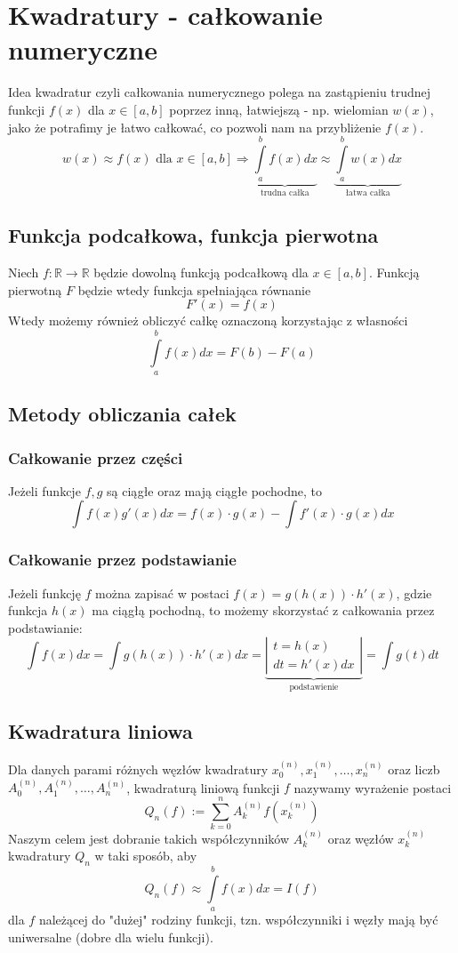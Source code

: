 \documentclass[a4paper,11pt]{article}
\begin{document}
\clearpage
\section{Kwadratury - całkowanie numeryczne}
Idea kwadratur czyli całkowania numerycznego polega na zastąpieniu trudnej funkcji $f(x)$ dla $x\in[a,b]$ poprzez inną, łatwiejszą - np. wielomian $w(x)$, jako że potrafimy je łatwo całkować, co pozwoli nam na przybliżenie $f(x)$.\\
$$w(x) \approx f(x) \text{ dla } x\in[a,b] \Rightarrow \underbrace{\int\limits_{a}^{b} f(x)dx}_{\text{trudna całka}} \approx \underbrace{\int\limits_{a}^{b} w(x)dx}_{\text{łatwa całka}}$$

\subsection{Funkcja podcałkowa, funkcja pierwotna}
Niech $f: \mathbb{R}\to\mathbb{R}$ będzie dowolną funkcją podcałkową dla $x \in [a,b]$. Funkcją pierwotną $F$ będzie wtedy funkcja spełniająca równanie
$$ F'(x) = f(x)$$
\noindent Wtedy możemy również obliczyć całkę oznaczoną korzystając z własności
$$\int\limits_{a}^{b} f(x)dx = F(b) - F(a)$$

\subsection{Metody obliczania całek}
\subsubsection{Całkowanie przez części}
Jeżeli funkcje $f, g$ są ciągłe oraz mają ciągłe pochodne, to
$$ \int f(x)g'(x)dx = f(x)\cdot g(x) - \int f'(x)\cdot g(x) dx$$

\subsubsection{Całkowanie przez podstawianie}
Jeżeli funkcję $f$ można zapisać w postaci $f(x)=g(h(x))\cdot h'(x)$, gdzie funkcja $h(x)$ ma ciągłą pochodną, to możemy skorzystać z całkowania przez podstawianie:
$$ \int f(x)dx = \int g(h(x))\cdot h'(x) dx = \underbrace{\left| \substack{t = h(x) \\ dt = h'(x)dx} \right|}_{\text{podstawienie}} = \int g(t)dt$$

\subsection{Kwadratura liniowa}
Dla danych parami różnych węzłów kwadratury $x_0^{(n)}, x_1^{(n)}, \ldots, x_n^{(n)}$ oraz liczb $A_0^{(n)}, A_1^{(n)}, \ldots, A_n^{(n)}$, kwadraturą liniową funkcji $f$ nazywamy wyrażenie postaci
$$ Q_n(f) := \sum\limits_{k=0}^{n}  A_k^{(n)} f(x_k^{(n)})$$
\noindent Naszym celem jest dobranie takich współczynników $A_k^{(n)}$ oraz węzłów $x_k^{(n)}$ kwadratury $Q_n$ w taki sposób, aby
$$ Q_n(f) \approx \int\limits_{a}^{b} f(x)dx = I(f)$$
\noindent dla $f$ należącej do "dużej" rodziny funkcji, tzn. współczynniki i węzły mają być uniwersalne (dobre dla wielu funkcji).
\end{document}
